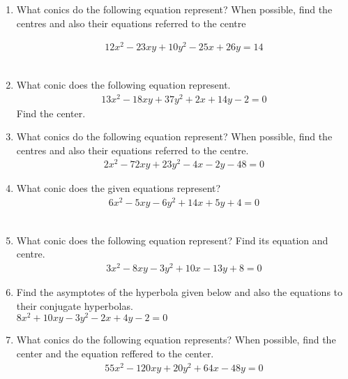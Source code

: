 \renewcommand{\theequation}{\theenumi}
\renewcommand{\thefigure}{\theenumi}
\begin{enumerate}[label=\thesection.\arabic*.,ref=\thesection.\theenumi]
%
\item What conics do the following equation represent? When possible, find the centres and also their equations referred to the centre

\begin{align}
12x^2-23xy+10y^2-25x+26y=14\label{eq:solutions/40/1/ques}
\end{align}
\\
\solution

\item What conic does the following equation represent. 
\begin{align}
13x^2-18xy+37y^2+2x+14y-2 = 0
\end{align}
Find the center.
\\
\solution

%
\item What conics do the following equation represent? When possible, find the centres and also their equations referred to the centre.
\begin{align}
2x^2-72xy+23y^2-4x-2y-48=0\label{eq:solutions/40/4/ques}
\end{align}
\solution
%
\item What conic does the given equations represent?
\begin{align}
6x^2-5xy-6y^2+14x+5y+4=0
\end{align}
\\
\solution

\item What conic does the following equation represent? Find its equation and centre.
\begin{align*}
	3x^2 - 8xy - 3y^2 + 10x - 13y + 8 =0 
\end{align*}
\solution

%
\item Find the asymptotes of the hyperbola given below and also the equations to their conjugate hyperbolas.\\
$8x^2+10xy-3y^2-2x+4y-2=0$
%
\solution

%
\item What conics do the following equation represents? When possible, find the center and the equation reffered to the center.
\begin{multline}
55x^2 - 120xy + 20y^2 +64x -48y=0
\label{eq:solutions/40/9/eqn1}
\end{multline}
%
\solution

\end{enumerate}


